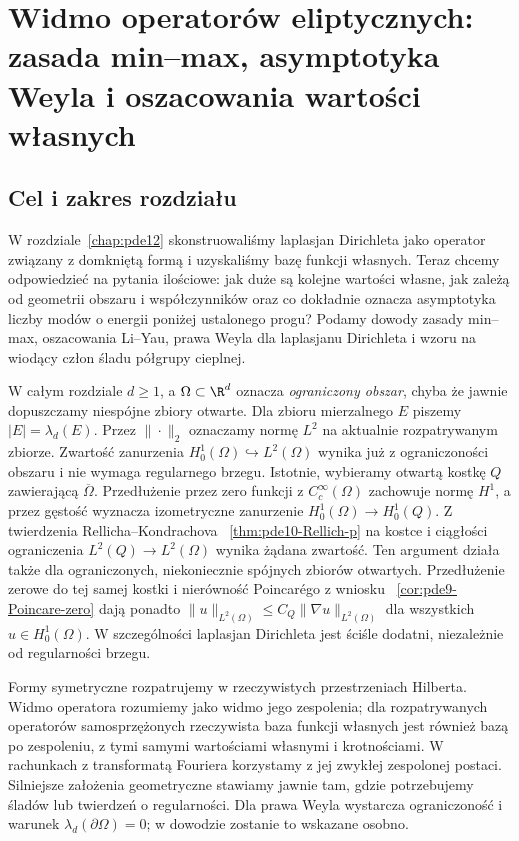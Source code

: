 \chapter[Widmo operatorów eliptycznych]{Widmo operatorów eliptycznych: zasada min--max, asymptotyka Weyla i oszacowania wartości własnych}
\label{chap:pde18}

\section{Cel i zakres rozdziału}
\label{sec:pde18-intro}
W rozdziale~\ref{chap:pde12} skonstruowaliśmy laplasjan Dirichleta
jako operator związany z domkniętą formą i uzyskaliśmy bazę
funkcji własnych. Teraz chcemy odpowiedzieć na pytania ilościowe:
jak duże są kolejne wartości własne, jak zależą od geometrii
obszaru i współczynników oraz co dokładnie oznacza asymptotyka
liczby modów o energii poniżej ustalonego progu? Podamy dowody
zasady min--max, oszacowania Li--Yau, prawa Weyla dla laplasjanu
Dirichleta i wzoru na wiodący człon śladu półgrupy cieplnej.

W całym rozdziale $d\ge1$, a $\Omega\subset\R^d$ oznacza
\emph{ograniczony obszar}, chyba że jawnie dopuszczamy
niespójne zbiory otwarte. Dla zbioru mierzalnego $E$
piszemy $|E|=\lambda_d(E)$. Przez $\|\cdot\|_2$ oznaczamy
normę $L^2$ na aktualnie rozpatrywanym zbiorze.
Zwartość zanurzenia
$H_0^1(\Omega)\hookrightarrow L^2(\Omega)$ wynika już z
ograniczoności obszaru i nie wymaga regularnego brzegu.
Istotnie, wybieramy otwartą kostkę $Q$ zawierającą
$\overline\Omega$. Przedłużenie przez zero funkcji z
$C_c^\infty(\Omega)$ zachowuje normę $H^1$, a przez
gęstość wyznacza izometryczne zanurzenie
$H_0^1(\Omega)\to H_0^1(Q)$. Z twierdzenia Rellicha--Kondrachova
~\ref{thm:pde10-Rellich-p} na kostce i ciągłości ograniczenia
$L^2(Q)\to L^2(\Omega)$ wynika żądana zwartość.
Ten argument działa także dla ograniczonych, niekoniecznie
spójnych zbiorów otwartych. Przedłużenie zerowe do tej
samej kostki i nierówność Poincarégo z wniosku
~\ref{cor:pde9-Poincare-zero} dają ponadto
$\|u\|_{L^2(\Omega)}\le C_Q\|\nabla u\|_{L^2(\Omega)}$
dla wszystkich $u\in H_0^1(\Omega)$. W szczególności
laplasjan Dirichleta jest ściśle dodatni, niezależnie
od regularności brzegu.

Formy symetryczne rozpatrujemy w rzeczywistych przestrzeniach
Hilberta. Widmo operatora rozumiemy jako widmo jego
zespolenia; dla rozpatrywanych operatorów samosprzężonych
rzeczywista baza funkcji własnych jest również bazą
po zespoleniu, z tymi samymi wartościami własnymi
i krotnościami. W rachunkach z transformatą Fouriera
korzystamy z jej zwykłej zespolonej postaci.
Silniejsze założenia geometryczne stawiamy jawnie tam,
gdzie potrzebujemy śladów lub twierdzeń o regularności.
Dla prawa Weyla wystarcza ograniczoność i warunek
$\lambda_d(\partial\Omega)=0$; w dowodzie zostanie
to wskazane osobno.

